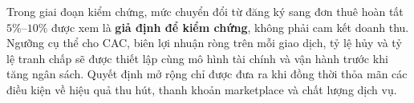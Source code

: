 Trong giai đoạn kiểm chứng, mức chuyển đổi từ đăng ký sang đơn thuê hoàn tất $5\%$--$10\%$ được xem là \textbf{giả định để kiểm chứng}, không phải cam kết doanh thu. Ngưỡng cụ thể cho CAC, biên lợi nhuận ròng trên mỗi giao dịch, tỷ lệ hủy và tỷ lệ tranh chấp sẽ được thiết lập cùng mô hình tài chính và vận hành trước khi tăng ngân sách. Quyết định mở rộng chỉ được đưa ra khi đồng thời thỏa mãn các điều kiện về hiệu quả thu hút, thanh khoản marketplace và chất lượng dịch vụ.
